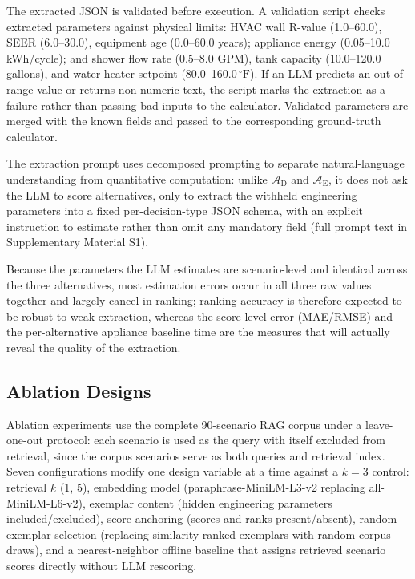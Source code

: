 \documentclass[a4paper,fleqn]{cas-dc}
\begin{document}
The extracted JSON is validated before execution. A validation script checks extracted parameters against physical limits: HVAC wall R-value (1.0--60.0), SEER (6.0--30.0), equipment age (0.0--60.0 years); appliance energy (0.05--10.0 kWh/cycle); and shower flow rate (0.5--8.0 GPM), tank capacity (10.0--120.0 gallons), and water heater setpoint (80.0--160.0\,$^\circ\text{F}$). If an LLM predicts an out-of-range value or returns non-numeric text, the script marks the extraction as a failure rather than passing bad inputs to the calculator. Validated parameters are merged with the known fields and passed to the corresponding ground-truth calculator.

The extraction prompt uses decomposed prompting \citep{khot2023} to separate natural-language understanding from quantitative computation: unlike $\mathcal{A}_{\text{D}}$ and $\mathcal{A}_{\text{E}}$, it does not ask the LLM to score alternatives, only to extract the withheld engineering parameters into a fixed per-decision-type JSON schema, with an explicit instruction to estimate rather than omit any mandatory field (full prompt text in Supplementary Material S1).

Because the parameters the LLM estimates are scenario-level and identical across the three alternatives, most estimation errors occur in all three raw values together and largely cancel in ranking; ranking accuracy is therefore expected to be robust to weak extraction, whereas the score-level error (MAE/RMSE) and the per-alternative appliance baseline time are the measures that will actually reveal the quality of the extraction.

\subsection{Ablation Designs}
\label{sec:rag-ablation-methods}
\label{sec:prompt-ablation-methods}
\label{sec:hybrid-ablation-methods}
Ablation experiments use the complete 90-scenario RAG corpus under a leave-one-out protocol: each scenario is used as the query with itself excluded from retrieval, since the corpus scenarios serve as both queries and retrieval index. Seven configurations modify one design variable at a time against a $k=3$ control: retrieval $k$ (1, 5), embedding model (paraphrase-MiniLM-L3-v2 replacing all-MiniLM-L6-v2), exemplar content (hidden engineering parameters included/excluded), score anchoring (scores and ranks present/absent), random exemplar selection (replacing similarity-ranked exemplars with random corpus draws), and a nearest-neighbor offline baseline that assigns retrieved scenario scores directly without LLM rescoring.
\end{document}
